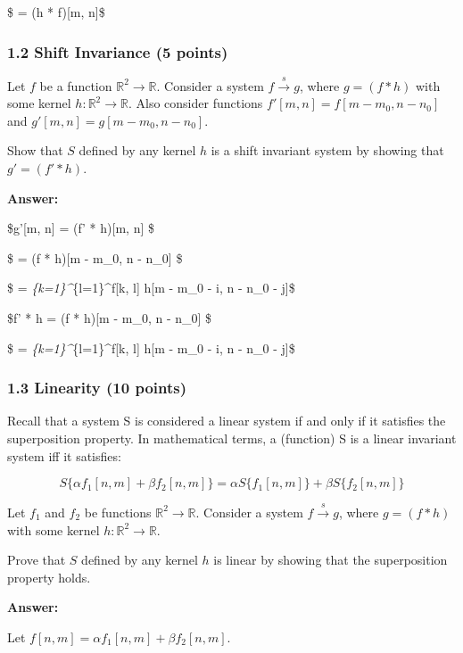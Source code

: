 \documentclass[11pt]{article}
\begin{document}
\$ = (h * f){[}m, n{]}\$

    \hypertarget{shift-invariance-5-points}{%
\subsubsection{1.2 Shift Invariance (5
points)}\label{shift-invariance-5-points}}

Let \(f\) be a function \(\mathbb{R}^2\rightarrow\mathbb{R}\). Consider
a system \(f\xrightarrow{s}g\), where \(g=(f*h)\) with some kernel
\(h:\mathbb{R}^2\rightarrow\mathbb{R}\). Also consider functions
\(f'[m,n] = f[m-m_0, n-n_0]\) and \(g'[m,n] = g[m-m_0, n-n_0]\).

Show that \(S\) defined by any kernel \(h\) is a shift invariant system
by showing that \(g' = (f'*h)\).

    \textbf{Answer:}

\$g'{[}m, n{]} = (f' * h){[}m, n{]} \$

\$ = (f * h){[}m - m\_0, n - n\_0{]} \$

\$ = \sum\emph{\{k=1\}\^{}\infty\sum}\{l=1\}\^{}\infty f{[}k, l{]}
\cdot h{[}m - m\_0 - i, n - n\_0 - j{]}\$

\$f' * h = (f * h){[}m - m\_0, n - n\_0{]} \$

\$ = \sum\emph{\{k=1\}\^{}\infty\sum}\{l=1\}\^{}\infty f{[}k, l{]}
\cdot h{[}m - m\_0 - i, n - n\_0 - j{]}\$

    \hypertarget{linearity-10-points}{%
\subsubsection{1.3 Linearity (10 points)}\label{linearity-10-points}}

Recall that a system S is considered a linear system if and only if it
satisfies the superposition property. In mathematical terms, a
(function) S is a linear invariant system iff it satisfies:

\[
S\{\alpha f_1[n,m] + \beta f_2[n,m]\} = \alpha S\{f_1[n,m]\} + \beta S\{f_2[n,m]\}
\]

Let \(f_1\) and \(f_2\) be functions
\(\mathbb{R}^2\rightarrow\mathbb{R}\). Consider a system
\(f\xrightarrow{s}g\), where \(g=(f*h)\) with some kernel
\(h:\mathbb{R}^2\rightarrow\mathbb{R}\).

Prove that \(S\) defined by any kernel \(h\) is linear by showing that
the superposition property holds.

    \textbf{Answer:}

Let \(f[n, m] = \alpha f_1[n, m] + \beta f_2[n, m]\).
\end{document}
